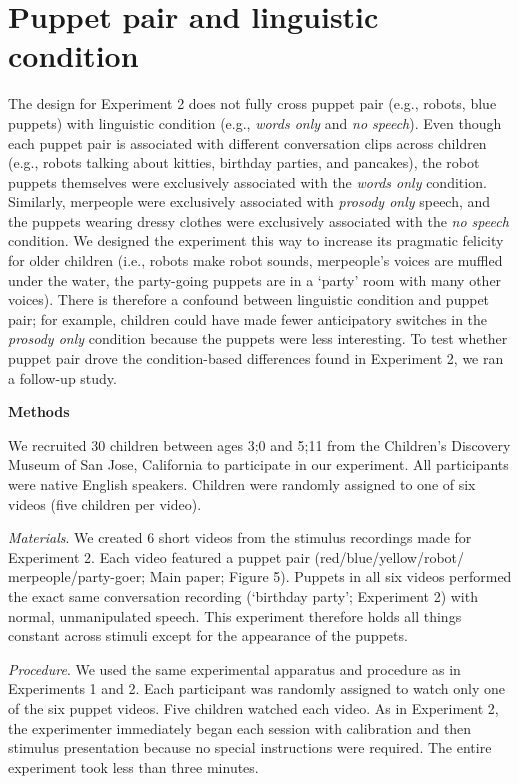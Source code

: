 \documentclass[authoryear, 12pt]{elsarticle}
\begin{document}
\section{Puppet pair and linguistic condition}
\label{sec:puppetconfound}
\setcounter{figure}{0}
The design for Experiment 2 does not fully cross puppet pair (e.g., robots, blue puppets) with linguistic condition (e.g., \textit{words only} and \textit{no speech}). Even though each puppet pair is associated with different conversation clips across children (e.g., robots talking about kitties, birthday parties, and pancakes), the robot puppets themselves were exclusively associated with the \textit{words only} condition. Similarly, merpeople were exclusively associated with \textit{prosody only} speech, and the puppets wearing dressy clothes were exclusively associated with the \textit{no speech} condition. We designed the experiment this way to increase its pragmatic felicity for older children (i.e., robots make robot sounds, merpeople's voices are muffled under the water, the party-going puppets are in a `party' room with many other voices). There is therefore a confound between linguistic condition and puppet pair; for example, children could have made fewer anticipatory switches in the \textit{prosody only} condition because the puppets were less interesting. To test whether puppet pair drove the condition-based differences found in Experiment 2, we ran a follow-up study.

\medskip
\noindent \textbf{Methods}
\medskip

\noindent We recruited 30 children between ages 3;0 and 5;11 from the Children's Discovery Museum of San Jose, California to participate in our experiment. All participants were native English speakers. Children were randomly assigned to one of six videos (five children per video).

\medskip
\noindent \textit{Materials}. We created 6 short videos from the stimulus recordings made for Experiment 2. Each video featured a puppet pair (red/blue/yellow/robot/ merpeople/party-goer; Main paper; Figure 5). Puppets in all six videos performed the exact same conversation recording (`birthday party'; Experiment 2) with normal, unmanipulated speech. This experiment therefore holds all things constant across stimuli except for the appearance of the puppets.

\medskip
\noindent \textit{Procedure}. We used the same experimental apparatus and procedure as in Experiments 1 and 2. Each participant was randomly assigned to watch only one of the six puppet videos. Five children watched each video. As in Experiment 2, the experimenter immediately began each session with calibration and then stimulus presentation because no special instructions were required. The entire experiment took less than three minutes.
\end{document}
